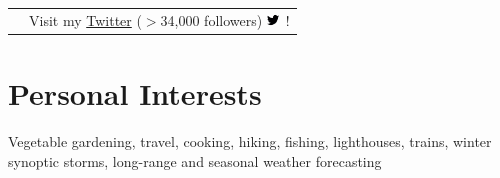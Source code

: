 \documentclass[margin,line,palatino,courier,10pt]{res}
\begin{document}
\begin{resume}
\begin{tabular}{@{}p{0.9in}p{4in}}
& Visit my \href{https://twitter.com/ZLabe}{Twitter} ($>$34,000 followers) \includegraphics[height=9pt]{twitter.png}\ !\\
\end{tabular}

\vspace{-0.1in}
\noindent\textcolor{Cerulean}{\makebox[\linewidth][r]{\rule{\textwidth}{5pt}}}
\vspace{-0.3in}
\section{\sc \textcolor{Cerulean}{\large{\textbf{Personal Interests}}}}
Vegetable gardening, travel, cooking, hiking, fishing, lighthouses, trains, winter synoptic storms, long-range and seasonal weather forecasting

\end{resume}
\end{document}
